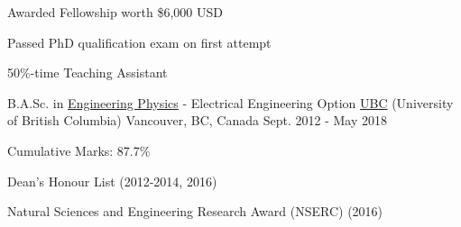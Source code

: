 \begin{cventries}
{\begin{cvitems}
        \item Awarded Fellowship worth \$6,000 USD
        \item Passed PhD qualification exam on first attempt
        \item 50\%-time Teaching Assistant
      \end{cvitems}
    }
  \cventry
    {B.A.Sc. in \href{https://www.engphys.ubc.ca/}{Engineering Physics} - Electrical Engineering Option}
    {\href{https://www.ubc.ca/}{UBC} (University of British Columbia)}
    {Vancouver, BC, Canada}
    {Sept. 2012 - May 2018}
    {
      \begin{cvitems}
        \item Cumulative Marks: 87.7\%
        \item Dean's Honour List (2012-2014, 2016)
        \item {Natural Sciences and Engineering Research Award (NSERC) (2016)}
      \end{cvitems}
    }
\end{cventries}


